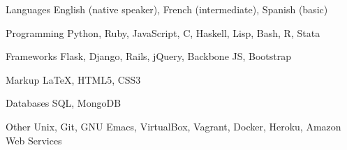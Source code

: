 
\begin{cvskills}
  
  \cvskill
    {Languages}
    {English (native speaker), French (intermediate), Spanish (basic)}
  
  \cvskill
    {Programming}
    {Python, Ruby, JavaScript, C, Haskell, Lisp, Bash, R, Stata}
    
  \cvskill
    {Frameworks}
    {Flask, Django, Rails, jQuery, Backbone JS, Bootstrap}
  
  \cvskill
    {Markup}
    {\LaTeX, HTML5, CSS3}
    
  \cvskill
    {Databases}
    {SQL, MongoDB}
    
  \cvskill
    {Other}
    {Unix, Git, GNU Emacs, VirtualBox, Vagrant, Docker, Heroku, Amazon Web Services}
  
  
\end{cvskills}


